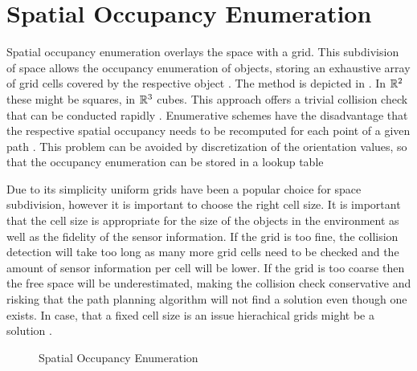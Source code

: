 \section{Spatial Occupancy Enumeration} \label{sec:spatialOccupancyEnumeration}
Spatial occupancy enumeration overlays the space with a grid. This subdivision of space allows the occupancy enumeration of objects, storing an exhaustive array of grid cells covered by the respective object \cite{Ericson.2005,Hayward.1986}. The method is depicted in . In $\mathbb{R}^2$ these might be squares, in $\mathbb{R}^3$ cubes. This approach offers a trivial collision check that can be conducted rapidly \cite{Ericson.2005,Hayward.1986}. Enumerative schemes have the disadvantage that the respective spatial occupancy needs to be recomputed for each point of a given path \cite{Hayward.1986}. This problem can be avoided by discretization of the orientation values, so that the occupancy enumeration can be stored in a lookup table \cite{Ziegler.2008} 

Due to its simplicity uniform grids have been a popular choice for space subdivision, however it is important to choose the right cell size. It is important that the cell size is appropriate for the size of the objects in the environment as well as the fidelity of the sensor information. If the grid is too fine, the collision detection will take too long as many more grid cells need to be checked and the amount of sensor information per cell will be lower. If the grid is too coarse then the free space will be underestimated, making the collision check conservative and risking that the path planning algorithm will not find a solution even though one exists. In case, that a fixed cell size is an issue hierachical grids might be a solution \cite{Ericson.2005}.

\begin{figure}[h]
    \caption{Spatial Occupancy Enumeration}
    \label{fig:spatialOccupancyEnumeration}
\end{figure}